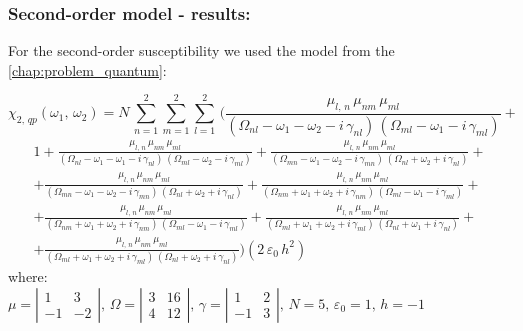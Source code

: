 \documentclass[12pt,twoside,a4paper]{article}
\numberwithin{equation}{subsection}
\numberwithin{figure}{subsection}
\begin{document}
\subsubsection*{Second-order model - results:}

For the second-order susceptibility we used the model from the \ref{chap:problem_quantum}:

\begin{equation} \label{nclin_chipp2}
  \chi_{2, \,qp}({\omega_{1}}, \,{\omega_{2}})=N\,\sum_{n=1}^{2}\sum_{m=1}^{2}\sum_{l=1}^{2}\,
    (\frac {{\mu_{l,\,n}}\,{\mu_{nm}}\,{\mu_{ml}}}
      {({\Omega_{nl}} - \omega_1 - \omega_2 - i\,{\gamma_{nl}})\,({\Omega_{ml}} - \omega_1 - i\,{\gamma_{ml}})} +
\end{equation}
\begin{alignat*}{1}
  + \frac   {{\mu_{l, \,n}}\,{\mu_{nm}}\,{\mu_{ml}}}
      {({\Omega_{nl}} - \omega_1 - \omega_1 - i\,{\gamma_{nl}})\,({\Omega_{ml}} - \omega_2 - i\,{\gamma_{ml}})}
      \nonumber 
  + \frac   {{\mu_{l, \,n}}\,{\mu_{nm}}\,{\mu_{ml}}}
      {({\Omega_{mn}} - \omega_1 - \omega_2 - i\,{\gamma_{mn}})\,({\Omega_{nl}} + \omega_2 + i\,{\gamma_{nl}})}
      \nonumber 
+\\ + \frac{{\mu_{l, \,n }}\,{\mu_{nm}}\,{\mu_{ml}}} 
      {({\Omega_{mn}} - \omega_1 - \omega_2 - i\,{\gamma_{mn}})\,({\Omega_{nl}} + \omega_2 + i\,{\gamma_{nl}})} 
  + \frac   {{\mu_{l, \,n}}\,{\mu_{nm}}\,{\mu_{ml}}}
      {({\Omega_{nm}} + \omega_1 + \omega_2 + i\,{\gamma_{nm}})\,({\Omega_{ml}} - \omega_1 - i\,{\gamma_{ml}})}
      \nonumber
+\\ + \frac {{\mu_{l, \,n}}\,{\mu_{ nm}}\,{\mu_{ml}}}
      {({\Omega_{nm}} + \omega_1 + \omega_2 + i\,{\gamma_{nm}})\,({\Omega_{ml}} - \omega_1 - i\,{\gamma_{ml}})} 
  + \frac {{\mu_{l, \,n}}\,{\mu_{nm}}\,{\mu_{ml}}}
      {({\Omega_{ml}} + \omega_1 + \omega_2 + i\,{\gamma_{ml}})\,({\Omega_{nl}} + \omega_1 + i\,{\gamma_{nl}})}
      \nonumber 
+\\ + \frac {{\mu_{l, \,n}}\,{\mu_{nm}}\,{\mu_{ml}}}
      {({\Omega_{ml}} + \omega_1 + \omega_2 + i\,{\gamma_{ml}})\,({\Omega_{nl}} + \omega_2 + i\,{\gamma_{nl}})})  
      (2\,{\varepsilon_{0}}\,h^{2})
\end{alignat*}
where: \\
$\mu = \left| \begin{array}{cc} 
    1 & 3 \\ -1 & -2 
  \end{array} \right|,\, 
  \Omega = \left| \begin{array}{cc} 
    3 & 16 \\ 4 & 12 
  \end{array} \right|,\,
  \gamma = \left| \begin{array}{cc} 
  1 & 2 \\ -1 & 3
  \end{array} \right|,\, N=5,\, {\varepsilon_{0}}=1,\,h= - 1$
\end{document}
